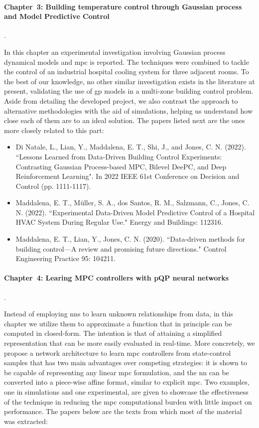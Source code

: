 \paragraph{Chapter~3: Building temperature control through Gaussian process and Model Predictive Control}.

In this chapter an experimental investigation involving Gaussian process dynamical models and \ac{mpc} is reported. The techniques were combined to tackle the control of an industrial hospital cooling system for three adjacent rooms. To the best of our knowledge, no other similar investigation exists in the literature at present, validating the use of \ac{gp} models in a multi-zone building control problem. Aside from detailing the developed project, we also contrast the approach to alternative methodologies with the aid of simulations, helping us understand how close each of them are to an ideal solution. The papers listed next are the ones more closely related to this part: 

\begin{itemize}
	\item Di Natale, L., Lian, Y., Maddalena, E. T., Shi, J., and Jones, C. N. (2022). ``Lessons Learned from Data-Driven Building Control Experiments: Contrasting Gaussian Process-based MPC, Bilevel DeePC, and Deep Reinforcement Learning". In 2022 IEEE 61st Conference on Decision and Control (pp. 1111-1117). 
	
	\item Maddalena, E. T., Müller, S. A., dos Santos, R. M., Salzmann, C., Jones, C. N. (2022). ``Experimental Data-Driven Model Predictive Control of a Hospital HVAC System During Regular Use." Energy and Buildings: 112316.
	
	\item Maddalena, E. T., Lian, Y., Jones, C. N. (2020). ``Data-driven methods for building control—A review and promising future directions." Control Engineering Practice 95: 104211.
\end{itemize}

\paragraph{Chapter~4: Learing MPC controllers with pQP neural networks}.

Instead of employing \acp{nn} to learn unknown relationships from data, in this chapter we utilize them to approximate a function that in principle can be computed in closed-form. The intention is that of attaining a simplified representation that can be more easily evaluated in real-time. More concretely, we propose a network architecture to learn \ac{mpc} controllers from state-control samples that has two main advantages over competing strategies: it is shown to be capable of representing any linear \ac{mpc} formulation, and the \ac{nn} can be converted into a piece-wise affine format, similar to explicit \ac{mpc}. Two examples, one in simulations and one experimental, are given to showcase the effectiveness of the technique in reducing the \ac{mpc} computational burden with little impact on performance. The papers below are the texts from which most of the material was extracted:

